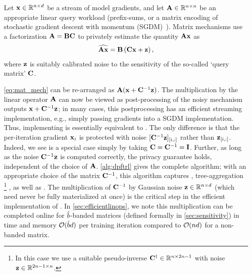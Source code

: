 \documentclass{article}
\begin{document}
Let $\mathbf{x} \in \mathbb{R}^{n \times d}$ be a stream of model gradients, and let $\mathbf{A} \in \mathbb{R}^{n \times n}$ be an appropriate linear query workload (prefix-sums, or a matrix encoding of stochastic gradient descent with momentum (SGDM)~\citep{denisov22matfact}).
%
Matrix mechanisms use a factorization $\mathbf{A} = \mathbf{B}\mathbf{C}$ to privately estimate the quantity $\mathbf{A} \mathbf{x}$ as 
\begin{equation}\label{eq:mat_mech}
\widehat{\mathbf{A}\mathbf{x}} = \mathbf{B}\left(\mathbf{C}\mathbf{x} + \mathbf{z}\right),
\end{equation}
where $\mathbf{z}$ is suitably calibrated noise to the sensitivity of the so-called `query matrix' $\mathbf{C}$.  

\cref{eq:mat_mech} can be re-arranged as $\mathbf{A}(\mathbf{x} + \mathbf{C}^{-1} \mathbf{z})$. The multiplication by the linear operator $\mathbf{A}$ can now be viewed as post-processing of the noisy mechanism outputs $\mathbf{x} + \mathbf{C}^{-1} \mathbf{z}$; in many cases, this postprocessing has an efficient streaming implementation, e.g., simply passing gradients into a SGDM implementation. Thus, implementing \MFFTRL is essentially equivalent to \DPSGD. The only difference is that the per-iteration gradient $\mathbf{x}_i$ is protected with noise $[\mathbf{C}^{-1} \mathbf{z}]_{[i, :]}$ rather than $\mathbf{z}_{[i, :]}$. Indeed, we see \DPSGD is a special case simply by taking $\mathbf{C} = \mathbf{C}^{-1} = \mathbf{I}$. Further, as long as the noise $\mathbf{C}^{-1} \mathbf{z}$ is computed correctly, the privacy guarantee holds, independent of the choice of $\mathbf{A}$.  \cref{alg:dpftrl} gives the complete algorithm; with an appropriate choice of the matrix $\mathbf{C}^{-1}$, this algorithm captures \dpsgd, tree-aggregation \DPFTRL\footnote{In this case we use a suitable pseudo-inverse $\mathbf{C}^\dagger \in \mathbb{R}^{n \times 2n -1}$ with noise $\mathbf{z} \in \mathbb{R}^{2n -1 \times n}$.} \citep{kairouz2021practical}, as well as \mfftrl \citep{denisov22matfact,choquette2022multi}.
%
The multiplication of $\mathbf{C}^{-1}$ by Gaussian noise $\mathbf{z} \in \mathbb{R}^{n \times d}$ (which need never be fully materialized at once) is the critical step in the efficient implementation of \MF. In \cref{sec:efficientlinops}, we note this multiplication can be completed online for $\hat{b}$-banded matrices (defined formally in \cref{sec:sensitivity}) in time and memory $\mathcal{O}(\hat{b} d)$ per training iteration compared to $\mathcal{O}(n d)$ for a non-banded matrix.
\end{document}
